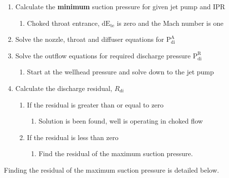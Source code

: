 \documentclass[12 pt]{report}
\newcommand{\dete}{$\mathrm{dE_{te}}$\xspace}  %
\newcommand{\pdiA}{$\mathrm{P_{di}^{A}}$\xspace}  %
\newcommand{\pdiR}{$\mathrm{P_{di}^{R}}$\xspace}  %
\begin{document}
\begin{enumerate}
    \item Calculate the \textbf{minimum} suction pressure for given jet pump and IPR
    \begin{enumerate}
        \item Choked throat entrance, \dete is zero and the Mach number is one
    \end{enumerate}
    \item Solve the nozzle, throat and diffuser equations for \pdiA
    \item Solve the outflow equations for required discharge pressure \pdiR
    \begin{enumerate}
        \item Start at the wellhead pressure and solve down to the jet pump
    \end{enumerate}
    \item Calculate the discharge residual, $R_{di}$
    \begin{enumerate}
        \item If the residual is greater than or equal to zero
        \begin{enumerate}
            \item Solution is been found, well is operating in choked flow
        \end{enumerate}
        \item If the residual is less than zero
        \begin{enumerate}
            \item Find the residual of the maximum suction pressure.
        \end{enumerate}
    \end{enumerate}
\end{enumerate}

Finding the residual of the maximum suction pressure is detailed below.
\end{document}
